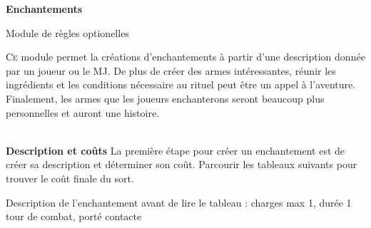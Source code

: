 \documentclass[11pt]{article} %
\newcommand{\enluminure}[2]{\lettrine[lines=3]{\small \initfamily #1}{#2}}
\newcommand{\myjump}[1][1]{\mbox{}\\[#1cm]}
\begin{document}
\pagestyle{empty}

\begin{center}
    \textbf{Enchantements}

    Module de règles optionelles
\end{center}

\enluminure{C}{e} module permet la créations d'enchantements à partir d'une description donnée par un joueur ou le MJ. De plus de créer des armes intéressantes, réunir les ingrédients et les conditions nécessaire au rituel peut être un appel à l'aventure. Finalement, les armes que les joueurs enchanterons seront beaucoup plus personnelles et auront une histoire.



\myjump[0]
\textbf{\huge Description et coûts}\newline
La première étape pour créer un enchantement est de créer sa description et déterminer son coût. Parcourir les tableaux suivants pour trouver le coût finale du sort.\newline


Description de l'enchantement avant de lire le tableau : charges max 1, durée 1 tour de combat, porté contacte
\end{document}
